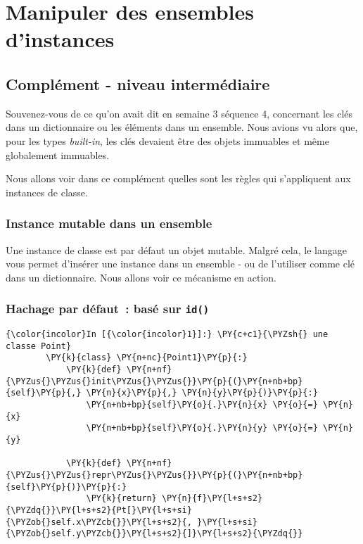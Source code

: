     
    
    
    

    

    \hypertarget{manipuler-des-ensembles-dinstances}{%
\section{Manipuler des ensembles
d'instances}\label{manipuler-des-ensembles-dinstances}}

    \hypertarget{compluxe9ment---niveau-intermuxe9diaire}{%
\subsection{Complément - niveau
intermédiaire}\label{compluxe9ment---niveau-intermuxe9diaire}}

    Souvenez-vous de ce qu'on avait dit en semaine 3 séquence 4, concernant
les clés dans un dictionnaire ou les éléments dans un ensemble. Nous
avions vu alors que, pour les types \emph{built-in}, les clés devaient
être des objets immuables et même globalement immuables.

    Nous allons voir dans ce complément quelles sont les règles qui
s'appliquent aux instances de classe.

    \hypertarget{instance-mutable-dans-un-ensemble}{%
\subsubsection{Instance mutable dans un
ensemble}\label{instance-mutable-dans-un-ensemble}}

    Une instance de classe est par défaut un objet mutable. Malgré cela, le
langage vous permet d'insérer une instance dans un ensemble - ou de
l'utiliser comme clé dans un dictionnaire. Nous allons voir ce mécanisme
en action.

    \hypertarget{hachage-par-duxe9faut-basuxe9-sur-id}{%
\subsubsection{\texorpdfstring{Hachage par défaut~: basé sur
\texttt{id()}}{Hachage par défaut~: basé sur id()}}\label{hachage-par-duxe9faut-basuxe9-sur-id}}

    \begin{Verbatim}[commandchars=\\\{\}]
{\color{incolor}In [{\color{incolor}1}]:} \PY{c+c1}{\PYZsh{} une classe Point}
        \PY{k}{class} \PY{n+nc}{Point1}\PY{p}{:}
            \PY{k}{def} \PY{n+nf}{\PYZus{}\PYZus{}init\PYZus{}\PYZus{}}\PY{p}{(}\PY{n+nb+bp}{self}\PY{p}{,} \PY{n}{x}\PY{p}{,} \PY{n}{y}\PY{p}{)}\PY{p}{:}
                \PY{n+nb+bp}{self}\PY{o}{.}\PY{n}{x} \PY{o}{=} \PY{n}{x}
                \PY{n+nb+bp}{self}\PY{o}{.}\PY{n}{y} \PY{o}{=} \PY{n}{y}
                
            \PY{k}{def} \PY{n+nf}{\PYZus{}\PYZus{}repr\PYZus{}\PYZus{}}\PY{p}{(}\PY{n+nb+bp}{self}\PY{p}{)}\PY{p}{:}
                \PY{k}{return} \PY{n}{f}\PY{l+s+s2}{\PYZdq{}}\PY{l+s+s2}{Pt[}\PY{l+s+si}{\PYZob{}self.x\PYZcb{}}\PY{l+s+s2}{, }\PY{l+s+si}{\PYZob{}self.y\PYZcb{}}\PY{l+s+s2}{]}\PY{l+s+s2}{\PYZdq{}}
\end{Verbatim}


